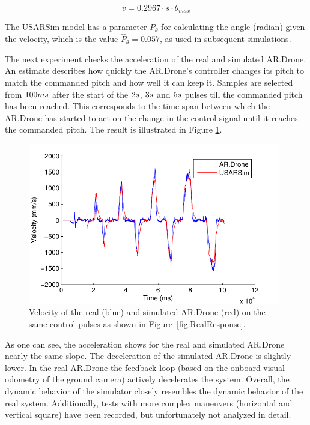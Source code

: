 \begin{equation}
v = 0.2967 \cdot s \cdot \theta_{max}
\label{eq:conversion}
\end{equation}

The USARSim model has a parameter $P_\theta$ for calculating the angle (radian) given the velocity, which
is the value $\hat{P}_\theta = 0.057$, as used in subsequent simulations.

The next experiment checks the acceleration of the real and simulated AR.Drone.
An estimate describes how quickly the AR.Drone's controller changes its pitch to match the commanded pitch and how well it can keep it.
Samples are selected from $100\small{ms}$ after the start
of the $2\small{s}$, $3\small{s}$ and $5\small{s}$ pulses till the commanded pitch has been reached.
This
corresponds to the time-span between which the AR.Drone has started to act on the change in the control
signal until it reaches the commanded pitch. The result is illustrated in Figure \ref{fig:ComparisonOfResponse}.

\begin{figure}[htb]
\centering
\includegraphics[width=11cm]{images/RYtdB-eps-converted-to.pdf}
\caption{Velocity of the real (blue) and simulated AR.Drone (red) on the same control pulses as shown in Figure~\ref{fig:RealResponse}.}

\label{fig:ComparisonOfResponse}
\end{figure}

As one can see, the acceleration shows for the real and simulated AR.Drone nearly the same slope. The deceleration of the simulated AR.Drone is slightly lower. In the real AR.Drone the feedback loop (based on the onboard visual odometry of the ground camera) actively decelerates the system. Overall, the dynamic behavior of the simulator closely resembles the dynamic behavior of the real system. Additionally, tests with more complex maneuvers (horizontal and vertical square) have been recorded, but unfortunately not analyzed in detail.




